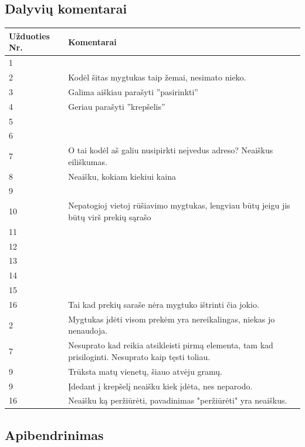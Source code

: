\documentclass[oneside]{VUMIFPSkursinis}
\begin{document}
	\subsection{Dalyvių komentarai}
\begin{center}
    \begin{tabular}{ |p{3cm}| p{12cm} |}
    \hline
	Užduoties Nr.&Komentarai\\ \hline
	1&\\ \hline
	2&Kodėl šitas mygtukas taip žemai, nesimato nieko.\\ \hline
	3&Galima aiškiau parašyti ''pasirinkti''\\ \hline
	4&Geriau parašyti ''krepšelis''\\ \hline
	5&\\ \hline
	6&\\ \hline
	7&O tai kodėl aš galiu nusipirkti neįvedus adreso? Neaiškus eiliškumas.\\ \hline
	8&Neaišku, kokiam kiekiui kaina\\ \hline
	9&\\ \hline
	10&Nepatogioj vietoj rūšiavimo mygtukas, lengviau būtų jeigu jis būtų virš prekių sąrašo\\ \hline
	11&\\ \hline
	12&\\ \hline
	13&\\ \hline
	14&\\ \hline
	15&\\ \hline
	16&Tai kad prekių saraše nėra mygtuko ištrinti čia jokio.\\ \hline
	2&Mygtukas įdėti visom prekėm yra nereikalingas, niekas jo nenaudoja.\\ \hline
	7&Nesuprato kad reikia atsikleisti pirmą elementa, tam kad prisiloginti. Nesuprato kaip tęsti toliau.\\ \hline
	9&Trūksta matų vienetų, šiauo atvėju gramų.\\ \hline
	9&Įdedant į krepšelį neaišku kiek įdėta, nes neparodo.\\ \hline
	16&Neaišku ką peržiūrėti, pavadinimas "peržiūrėti" yra neaiškus. \\ \hline
    \end{tabular}
\end{center}

\subsection{Apibendrinimas}
\end{document}
